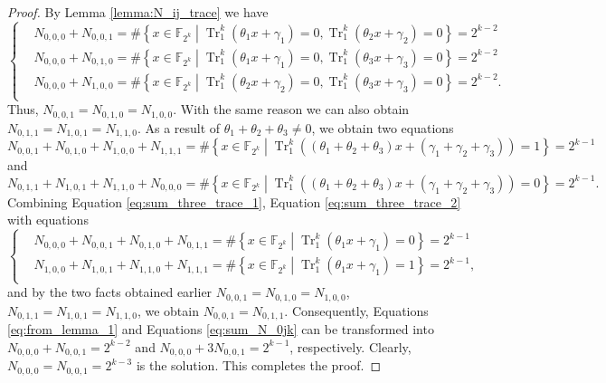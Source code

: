 \documentclass{article}
\newcommand{\F}{\mathbb{F}}
\newcommand{\0}{\textbf{0}}
\newcommand{\1}{\textbf{1}}
\newcommand{\TRACE}{\operatorname{Tr}_1^k}
\theoremstyle{plain}
\begin{document}
    \begin{proof}
        By Lemma \ref{lemma:N_ij_trace} we have
        \begin{equation}\label{eq:from_lemma_1}\left\{\begin{alignedat}{3}
        &N_{0,0,0}+N_{0,0,1}=\#\left\{x\in\F_{2^k}\middle|\TRACE\left(\theta_1x+\gamma_1\right)=0, \TRACE\left(\theta_2x+\gamma_2\right)=0\right\}=2^{k-2}\\
        &N_{0,0,0}+N_{0,1,0}=\#\left\{x\in\F_{2^k}\middle|\TRACE\left(\theta_1x+\gamma_1\right)=0, \TRACE\left(\theta_3x+\gamma_3\right)=0\right\}=2^{k-2}\\
        &N_{0,0,0}+N_{1,0,0}=\#\left\{x\in\F_{2^k}\middle|\TRACE\left(\theta_2x+\gamma_2\right)=0, \TRACE\left(\theta_3x+\gamma_3\right)=0\right\}=2^{k-2}.\\
        \end{alignedat}\right.\end{equation}
        Thus, $N_{0,0,1}=N_{0,1,0}=N_{1,0,0}$. With the same reason we can also obtain  $N_{0,1,1}=N_{1,0,1}=N_{1,1,0}$.
        As a result of $\theta_1+\theta_2+\theta_3\ne 0$, we obtain two equations
        \begin{equation}\label{eq:sum_three_trace_1}
            N_{0,0,1}+N_{0,1,0}+N_{1,0,0}+N_{1,1,1}=\#\left\{x\in\F_{2^k}\middle|\TRACE\left(\left(\theta_1+\theta_2+\theta_3\right)x+\left(\gamma_1+\gamma_2+\gamma_3\right)\right)=1\right\}=2^{k-1}
        \end{equation}
        and
        \begin{equation}\label{eq:sum_three_trace_2}
            N_{0,1,1}+N_{1,0,1}+N_{1,1,0}+N_{0,0,0}=\#\left\{x\in\F_{2^k}\middle|\TRACE\left(\left(\theta_1+\theta_2+\theta_3\right)x+\left(\gamma_1+\gamma_2+\gamma_3\right)\right)=0\right\}=2^{k-1}.
        \end{equation}
        Combining Equation \eqref{eq:sum_three_trace_1}, Equation \eqref{eq:sum_three_trace_2} with equations
        \begin{equation}\label{eq:sum_N_0jk}\left\{\begin{alignedat}{2}
            &N_{0,0,0}+N_{0,0,1}+N_{0,1,0}+N_{0,1,1}=\#\left\{x\in\F_{2^k}\middle|\TRACE\left(\theta_1x+\gamma_1\right)=0\right\}=2^{k-1}\\
            &N_{1,0,0}+N_{1,0,1}+N_{1,1,0}+N_{1,1,1}=\#\left\{x\in\F_{2^k}\middle|\TRACE\left(\theta_1x+\gamma_1\right)=1\right\}=2^{k-1},\\
        \end{alignedat}\right.\end{equation}
        and by the two facts obtained earlier $N_{0,0,1}=N_{0,1,0}=N_{1,0,0}$, $N_{0,1,1}=N_{1,0,1}=N_{1,1,0}$, we obtain $N_{0,0,1}=N_{0,1,1}$.
        Consequently, Equations \eqref{eq:from_lemma_1} and Equations \eqref{eq:sum_N_0jk} can be transformed into
        $N_{0,0,0}+N_{0,0,1}=2^{k-2}$ and $N_{0,0,0}+3N_{0,0,1}=2^{k-1}$, respectively.
        Clearly, $N_{0,0,0}=N_{0,0,1}=2^{k-3}$ is the solution. This completes the proof.
    \end{proof}
\end{document}
